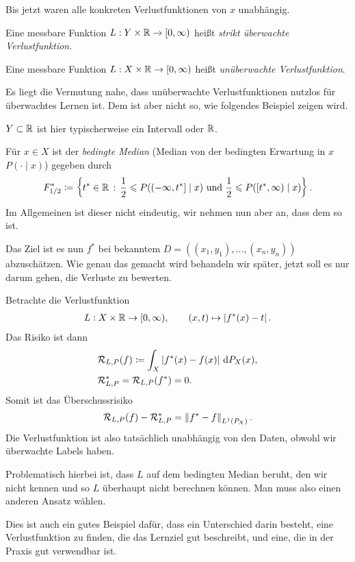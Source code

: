 Bis jetzt waren alle konkreten Verlustfunktionen von $x$ unabhängig.

\begin{defn}
\label{defn:1.2.4}
Eine messbare Funktion $L:Y\times\mathbb{R}\to [0,\infty)$ heißt \emph{strikt überwachte
Verlustfunktion}.\fishhere
\end{defn}

\begin{defn}
\label{defn:1.2.5}
Eine messbare Funktion $L:X\times\mathbb{R}\to [0,\infty)$ heißt \emph{unüberwachte
Verlustfunktion}.\fishhere
\end{defn}

Es liegt die Vermutung nahe, dass unüberwachte Verlustfunktionen nutzlos für
überwachtes Lernen ist. Dem ist aber nicht so, wie folgendes Beispiel zeigen
wird.

\begin{bsp*}
$Y\subset\mathbb{R}$ ist hier typischerweise ein Intervall oder $\mathbb{R}$.

Für $x\in X$ ist der \emph{bedingte Median} (Median von
der bedingten Erwartung in $x$ $P(\cdot\mid x)$) gegeben durch
\begin{align*}
F_{1/2}^* \coloneq \left\{ t^*\in\mathbb{R}\,:\,\frac{1}{2}\leqslant P((-\infty,t^*]\mid x)\text{ und
}\frac{1}{2}\leqslant P([t^*,\infty)\mid x)\right\}.
\end{align*}
Im Allgemeinen ist dieser nicht eindeutig, wir nehmen nun aber an, dass dem so
ist.

Das Ziel ist es nun $f^*$ bei bekanntem
$D=((x_1,y_1),\ldots,(x_n,y_n))$ abzuschätzen. Wie genau das gemacht wird
behandeln wir später, jetzt soll es nur darum gehen, die Verluste zu bewerten.

Betrachte die Verlustfunktion
\begin{align*}
L: X\times\mathbb{R} \to [0,\infty),\qquad (x,t)\mapsto \left|f^*(x)-t\right|.
\end{align*}
Das Risiko ist dann
\begin{align*}
&\mathcal{R}_{L,P}(f) \coloneq \int_X \left|f^*(x)-f(x)\right|\,\mathrm{d} P_X(x),\\
&\mathcal{R}^*_{L,P} = \mathcal{R}_{L,P}(f^*) = 0.
\end{align*}
Somit ist das Überschussrisiko
\begin{align*}
\mathcal{R}_{L,P}(f) - \mathcal{R}_{L,P}^* = \left\|f^*-f\right\|_{L^1(P_X)}.
\end{align*}
Die Verlustfunktion ist also tatsächlich unabhängig von den Daten, obwohl wir
überwachte Labels haben.

Problematisch hierbei ist, dass $L$ auf dem bedingten Median beruht, den wir
nicht kennen und so $L$ überhaupt nicht berechnen können. Man muss also einen
anderen Ansatz wählen.

Dies ist auch ein gutes Beispiel dafür, dass ein Unterschied darin besteht,
eine Verlustfunktion zu finden, die das Lernziel gut beschreibt, und eine, die 
in der Praxis gut verwendbar ist.\bsphere
\end{bsp*}

